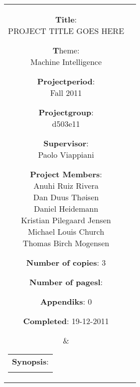	\begin{tabular}{cc}
		\parbox[0.1cm]{7cm}{ %
			\begin{description}
				\item {\textbf{Title}:} \\
					PROJECT TITLE GOES HERE
				\item {\textbf Theme:} \\
					Machine Intelligence
 			\end{description}

			\parbox{8cm}{ %
				\begin{description}
					\item {\textbf{Projectperiod}:}\\
					Fall 2011\\
					\hspace{4cm}
					\item {\textbf{Projectgroup}:}\\
					d503e11\\
					\hspace{4cm}
					\item {\textbf{Supervisor}:}\\
					Paolo Viappiani \\
					\item {\textbf{Project Members}:}\\ \newcommand{\sh}{18pt} %
					Anuhi Ruiz Rivera \\
					Dan Duus Thøisen \\
					Daniel Heidemann \\
					Kristian Pilegaard Jensen \\
					Michael Louis Church \\
					Thomas Birch Mogensen \\
				\end{description}
			}
			\begin{description}
				\item {\textbf{Number of copies}:} 3
				\item {\textbf{Number of pagesl}:} \pageref{LastPage}
				\item {\textbf{Appendiks}:} 0
				\item {\textbf{Completed}:} 19-12-2011
			\end{description}
			\vfill 
		} &
		\parbox{7cm}{ %
			\hfill %
			\begin{tabular}{l}%
				{\textbf{Synopsis}:}\bigskip \\%
				\fbox{ %
					\parbox{6.5cm}{\bigskip %
					{\vfill{\small %
					 
						\bigskip}}%
					}}%
			\end{tabular}%
		}
	\end{tabular}
	\\ \\

